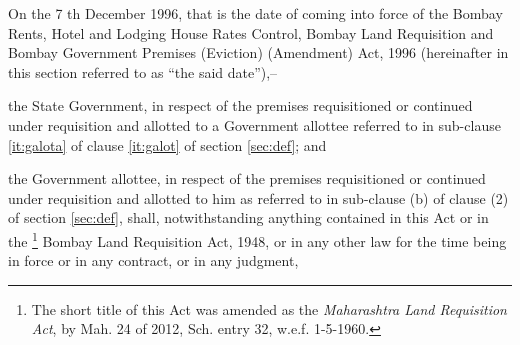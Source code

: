 \documentclass{mhact}
\begin{document}
\begin{subsectionlist}
\item On the 7 th December 1996, that is the date of coming into force
  of the Bombay Rents, Hotel and Lodging House Rates Control, Bombay
  Land Requisition and Bombay Government Premises (Eviction)
  (Amendment) Act, 1996  (hereinafter in
  this section referred to as ``the said date''),--
  \begin{clause}
  \item the State Government, in respect of the premises requisitioned
    or continued under requisition and allotted to a Government
    allottee referred to in sub-clause \ref{it:galota} of clause
    \ref{it:galot} of section
    \ref{sec:def};
    and
  \item the Government allottee, in respect of the premises
    requisitioned or continued under requisition and allotted to him
    as referred to in sub-clause (b) of clause (2) of section
    \ref{sec:def}, shall, notwithstanding anything contained in this
    Act or in the \footnote{The short title of this Act was amended as
      the \emph{Maharashtra Land Requisition Act}, by Mah. 24 of 2012,
      Sch. entry 32, w.e.f. 1-5-1960.  } Bombay Land Requisition Act,
    1948, or in any other law for the time being in force or in any
    contract, or in any judgment,
  \end{clause}
\end{subsectionlist}
\end{document}
